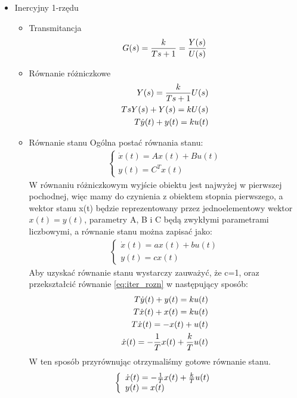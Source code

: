 \documentclass[a4paper,10pt]{article}
\begin{document}
\begin{itemize}
\item Inercyjny 1-rzędu

\begin{itemize}
\item Transmitancja	
	\begin{eqnarray}
		G(s)= {k \over {Ts + 1}} = {Y(s) \over U(s)}
	\end{eqnarray}
\item Równanie różniczkowe
	\begin{eqnarray}
		\nonumber Y(s) = {k \over {Ts + 1}} U(s)\\ 
		\nonumber TsY(s) + Y(s) = kU(s)\\
		T\dot{y}(t) + y(t) = ku(t) \label{eq:iter_rozn}
	\end{eqnarray}
\item Równanie stanu
\newline Ogólna postać równania stanu:
	\begin{eqnarray}
		\nonumber \left\{ \begin{array}{l}
			\dot{x}(t) = Ax(t) + Bu(t)\\
			y(t) = C^{T}x(t)
		\end{array} \right.
	\end{eqnarray}
W równaniu różniczkowym wyjście obiektu jest najwyżej w pierwszej pochodnej, więc mamy do czynienia z obiektem stopnia pierwszego, a wektor stanu x(t) będzie reprezentowany przez jednoelementowy wektor $x(t) = y(t)$, parametry A, B i C będą zwykłymi parametrami liczbowymi, a równanie stanu można zapisać jako:
	\begin{eqnarray}
		\nonumber \left\{ \begin{array}{l}
			\dot{x}(t) = ax(t) + bu(t)\\
			y(t) = cx(t)
		\end{array} \right.
	\end{eqnarray}
Aby uzyskać równanie stanu wystarczy zauważyć, że c=1, oraz przekształcić równanie \ref{eq:iter_rozn} w następujący sposób:
	\begin{eqnarray}
		\nonumber T\dot{y}(t) + y(t) = ku(t)\\
		\nonumber T\dot{x}(t) + x(t) = ku(t)\\
		\nonumber T\dot{x}(t) = - x(t) + u(t)\\
		\dot{x}(t) = -{1 \over T}x(t) + {k \over T}u(t)
	\end{eqnarray}
W ten sposób przyrównując otrzymaliśmy gotowe równanie stanu.
	\begin{eqnarray}
		\left\{ \begin{array}{l}
			\dot{x}(t) = -{1 \over T}x(t) + {k \over T}u(t)\\
			y(t) = x(t)
		\end{array} \right.
	\end{eqnarray}
\end{itemize}


\end{itemize}
\end{document}
